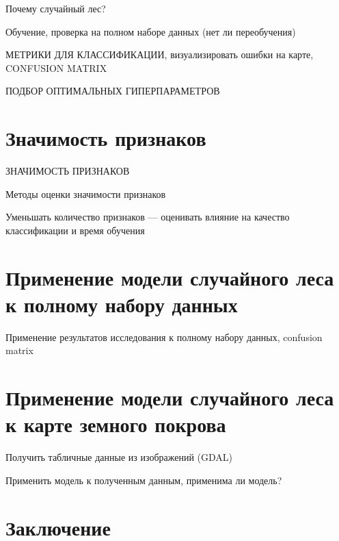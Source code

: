 \documentclass[14pt, a4paper, oneside]{extarticle}
\begin{document}
Почему случайный лес?

Обучение, проверка на полном наборе данных (нет ли переобучения)

МЕТРИКИ ДЛЯ КЛАССИФИКАЦИИ, визуализировать ошибки на карте, CONFUSION MATRIX

ПОДБОР ОПТИМАЛЬНЫХ ГИПЕРПАРАМЕТРОВ

\newpage

\section{Значимость признаков}
ЗНАЧИМОСТЬ ПРИЗНАКОВ

Методы оценки значимости признаков

Уменьшать количество признаков --- оценивать влияние на качество классификации и время обучения
\newpage

\section{Применение модели случайного леса к полному набору данных}
Применение результатов исследования к полному набору данных, confusion matrix
\newpage

\section{Применение модели случайного леса к карте земного покрова}
Получить табличные данные из изображений (GDAL)

Применить модель к полученным данным, применима ли модель?
\newpage

\section{Заключение}
\newpage
\end{document}
